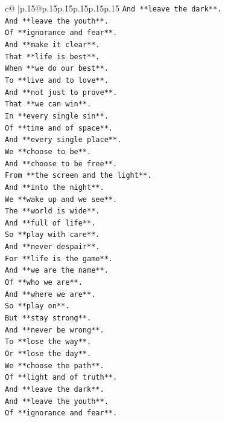 \documentclass{article}
\begin{document}
{\begin{supertabular}{c@{$\;$}|p{.15\linewidth}@{}p{.15\linewidth}p{.15\linewidth}p{.15\linewidth}p{.15\linewidth}p{.15\linewidth}}
{{{\texttt{And **leave the dark**.} \\
\texttt{And **leave the youth**.} \\
\texttt{Of **ignorance and fear**.} \\
\texttt{And **make it clear**.} \\
\texttt{That **life is best**.} \\
\texttt{When **we do our best**.} \\
\texttt{To **live and to love**.} \\
\texttt{And **not just to prove**.} \\
\texttt{That **we can win**.} \\
\texttt{In **every single sin**.} \\
\texttt{Of **time and of space**.} \\
\texttt{And **every single place**.} \\
\texttt{We **choose to be**.} \\
\texttt{And **choose to be free**.} \\
\texttt{From **the screen and the light**.} \\
\texttt{And **into the night**.} \\
\texttt{We **wake up and we see**.} \\
\texttt{The **world is wide**.} \\
\texttt{And **full of life**.} \\
\texttt{So **play with care**.} \\
\texttt{And **never despair**.} \\
\texttt{For **life is the game**.} \\
\texttt{And **we are the name**.} \\
\texttt{Of **who we are**.} \\
\texttt{And **where we are**.} \\
\texttt{So **play on**.} \\
\texttt{But **stay strong**.} \\
\texttt{And **never be wrong**.} \\
\texttt{To **lose the way**.} \\
\texttt{Or **lose the day**.} \\
\texttt{We **choose the path**.} \\
\texttt{Of **light and of truth**.} \\
\texttt{And **leave the dark**.} \\
\texttt{And **leave the youth**.} \\
\texttt{Of **ignorance and fear**.} \\
}}}
\end{supertabular}}
\end{document}
